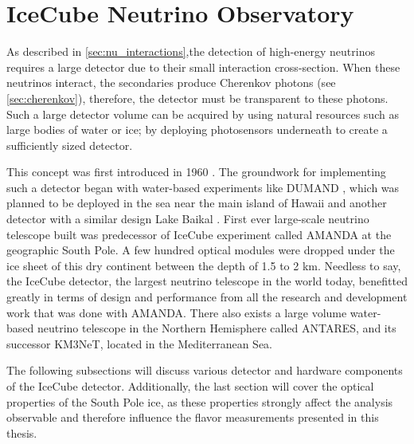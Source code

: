 \section{IceCube Neutrino Observatory}
\label{IC_detector}
As described in \ref{sec:nu_interactions},the detection of high-energy neutrinos requires a large detector due to their small interaction cross-section. When these neutrinos interact, the secondaries produce Cherenkov photons (see \ref{sec:cherenkov}), therefore, the detector must be transparent to these photons. Such a large detector volume can be acquired by using natural resources such as large bodies of water or ice; by deploying photosensors underneath to create a sufficiently sized detector.\par
This concept was first introduced in 1960 . The groundwork for implementing such a detector began with water-based experiments like DUMAND , which was planned to be deployed in the sea near the main island of Hawaii and another detector with a similar design Lake Baikal . First ever large-scale neutrino telescope built was predecessor of IceCube experiment called AMANDA  at the geographic South Pole. A few hundred optical modules were dropped under the ice sheet of this dry continent between the depth of 1.5 to 2 km. Needless to say, the IceCube detector, the largest neutrino telescope in the world today, benefitted greatly in terms of design and performance from all the research and development work that was done with AMANDA. 
There also exists a large volume water-based neutrino telescope in the Northern Hemisphere called ANTARES, and its successor KM3NeT, located in the Mediterranean Sea.\par
The following subsections will discuss various detector and hardware components of the IceCube detector. Additionally, the last section will cover the optical properties of the South Pole ice, as these properties strongly affect the analysis observable and therefore influence the flavor measurements presented in this thesis.\par


